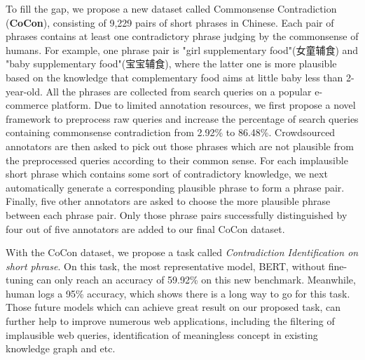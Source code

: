 To fill the gap, we propose a new dataset called Commonsense Contradiction (\textbf{CoCon}), consisting of 9,229 pairs of short phrases in Chinese. 
Each pair of phrases contains at least one contradictory phrase judging by the commonsense of 
humans.
For example, one phrase pair is "girl supplementary food"(女童辅食) and "baby supplementary food"(宝宝辅食), where the latter one is more plausible based on the knowledge that complementary food aims at little baby less than 2-year-old.
All the phrases are collected from search queries on a popular e-commerce platform.
Due to limited annotation resources, we first propose a novel framework to preprocess raw queries and increase the percentage of search queries containing commonsense contradiction from 2.92\% to 86.48\%.
Crowdsourced annotators are then asked to pick out those phrases which are 
not plausible from the preprocessed queries
according to their common sense. 
For each implausible short phrase which contains some sort of contradictory knowledge,
we next automatically generate a corresponding plausible phrase to form 
a phrase pair. %
Finally, five other annotators are asked to choose the more plausible phrase between
each phrase pair. 
Only those phrase pairs successfully distinguished by four out of 
five annotators are added to our final CoCon dataset. 

With the CoCon dataset, we propose a task called \textit{Contradiction Identification on short phrase}.
On this task, the most representative model, BERT,  
without fine-tuning can only reach an
accuracy of 59.92\% on this new benchmark.
Meanwhile, human logs a 95\% accuracy, which shows there is a long way to go for
this task. Those future models which can achieve great result on our proposed task, can further help to improve numerous web applications, including the filtering of implausible web queries, identification of meaningless concept in existing knowledge graph and etc.  


